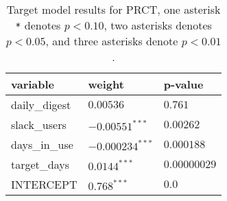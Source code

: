 \renewcommand{\arraystretch}{1.2}
\begin{table}
\begin{center}
\begin{tabular}{|p{6cm}|p{4cm}|p{4cm}|} 
\hline
variable & weight & p-value \\ [0.5ex]
\hline\hline

daily\_digest & $0.00536^{}$ & $0.761$ \\
slack\_users & $-0.00551^{***}$ & $0.00262$ \\
days\_in\_use & $-0.000234^{***}$ & $0.000188$ \\
target\_days & $0.0144^{***}$ & $0.00000029$ \\

\hline\hline
INTERCEPT & $0.768^{***}$ & $0.0$ \\ 

\hline
\end{tabular}
\caption{Target model results for PRCT, one asterisk \texttt{*} denotes  $p < 0.10$, two asterisks denotes $p < 0.05$, and three asterisks denote $p < 0.01$.}
\label{tab:lmResults}
\end{center}
\end{table}